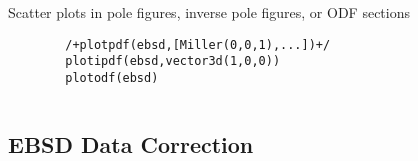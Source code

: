 \documentclass[compress]{beamer}
\begin{document}
\begin{frame}[fragile]
\begin{columns}
\begin{column}{8.5cm}
Scatter plots in pole figures, inverse pole figures, or ODF sections
\begin{lstlisting}
		/+plotpdf(ebsd,[Miller(0,0,1),...])+/
		plotipdf(ebsd,vector3d(1,0,0))
		plotodf(ebsd)
\end{lstlisting}

    \end{column}

    \begin{column}{3.5cm}
    \end{column}
  \end{columns}
\end{frame}



\subsection*{EBSD Data Correction}
\end{document}
